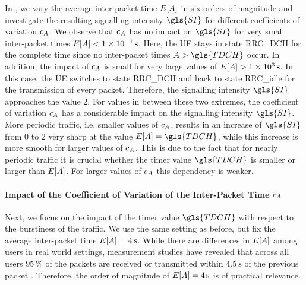 In , we vary the average inter-packet time \(E[A]\) in six orders of magnitude and investigate the resulting signalling intensity \(\gls{SI}\) for different coefficients of variation \(c_{A}\).
We observe that \(c_{A}\) has no impact on \(\gls{SI}\) for very small inter-packet times \(E[A]<\SI{1e-1}{\second}\).
Here, the \gls{UE} stays in state \gls{RRC_DCH} for the complete time since no inter-packet times \(\PacketIAT>\gls{TDCH}\) occur.
In addition, the impact of \(c_{A}\) is small for very large values of \(E[A]>\SI{1e3}{\second}\).
In this case, the \gls{UE} switches to state \gls{RRC_DCH} and back to state \gls{RRC_idle} for the transmission of every packet. Therefore, the signalling intensity \(\gls{SI}\) approaches the value 2.
For values in between these two extremes, the coefficient of variation \(c_{A}\) has a considerable impact on the signalling intensity \(\gls{SI}\).
More periodic traffic, i.e. smaller values of \(c_{A}\), results in an increase of \(\gls{SI}\) from 0 to 2 very sharp at the value \(E[\PacketIAT]=\gls{TDCH}\), while this increase is more smooth for larger values of \(c_{A}\).
This is due to the fact that for nearly periodic traffic it is crucial whether the timer value \(\gls{TDCH}\) is smaller or larger than \(E[A]\). 
For larger values of \(c_{A}\) this dependency is weaker.

\paragraph*{Impact of the Coefficient of Variation of the Inter-Packet Time \(c_A\)}

Next, we focus on the impact of the timer value \(\gls{TDCH}\) with respect to the burstiness of the traffic.
We use the same setting as before, but fix the average inter-packet time \(E[A]=\SI{4}{\second}\).
While there are differences in \(E[A]\) among users in real world settings, measurement studies have revealed that across all users \(\SI{95}{\percent}\) of the packets are received or transmitted within \(\SI{4.5}{\second}\) of the previous packet \cite{Falaki2010a}.
Therefore, the order of magnitude of \(E[A]=\SI{4}{\second}\) is of practical relevance. 

